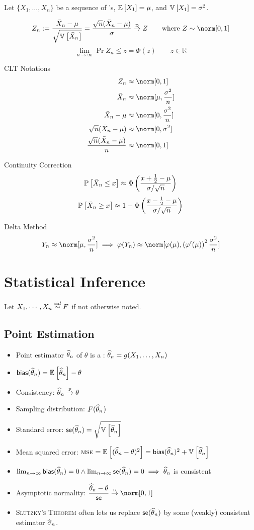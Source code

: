 \documentclass[landscape]{article}
\begin{document}
\begin{multicols*}{2}
Let $\{X_1,\ldots,X_n\}$ be a sequence of \iid \rv's, $\mathbb{E}_{}\left[X_1\right]=\mu$, and 
$\mathbb{V}_{}\left[X_1\right] = \sigma^2$.

$$ Z_n
  := \displaystyle\frac{\samplemean-\mu}{\sqrt{\V{\samplemean}}}
  = \displaystyle\frac{\sqrt{n}(\samplemean - \mu)}{\sigma}
  \dconv Z \qquad \text{where } Z\dist \norm[0,1]$$
$$\lim_{n\to\infty} \Pr{Z_n \le z} = \Phi(z) \qquad z \in \mathbb R$$

CLT Notations
\begin{align*}
Z_n &\approx \norm[0,1] \\
\samplemean &\approx \norm[\mu,\frac{\sigma^2}{n}] \\
\samplemean - \mu &\approx \norm[0,\frac{\sigma^2}{n}] \\
\sqrt{n}(\samplemean - \mu) &\approx \norm[0,\sigma^2] \\
\frac{\sqrt{n}(\samplemean - \mu)}{n} &\approx \norm[0,1] \\
\end{align*}

Continuity Correction
$$\mathbb{P}_{}\left[\bar{X}_n \le x\right] \approx 
  \Phi\left(\displaystyle\frac{x+\frac{1}{2}-\mu}{\sigma/\sqrt{n}}\right)$$
$$\mathbb{P}_{}\left[\bar{X}_n \ge x\right] \approx 
  1-\Phi\left(\displaystyle\frac{x-\frac{1}{2}-\mu}{\sigma/\sqrt{n}}\right)$$

Delta Method
$$Y_n \approx \norm[\mu,\frac{\sigma^2}{n}] \imp 
\transform(Y_n) \approx 
\norm[\transform(\mu),
  \left(\transform^\prime(\mu)\right)^2\frac{\sigma^2}{n}]$$

\section{Statistical Inference}

Let $X_1,\cdots,X_n \stackrel{iid}{\sim} F$ if not otherwise noted.

\subsection{Point Estimation}

\begin{itemize}
  \item Point estimator $\widehat{\theta}_n$ of $\theta$ is a \rv: 
    $\widehat{\theta}_n = g(X_1,\dots,X_n)$
  \item $\textsf{bias}(\widehat{\theta}_n) = \mathbb{E}_{}\left[\widehat{\theta}_n\right]-\theta$
  \item Consistency: $\widehat{\theta}_n \stackrel{\text{\tiny{P}}}{\rightarrow} \theta$
  \item Sampling distribution: $F(\widehat{\theta}_n$)
  \item Standard error: $\textsf{se}(\widehat{\theta}_n) = \sqrt{\mathbb{V}_{}\left[\widehat{\theta}_n\right]}$
  \item Mean squared error: $\textsc{mse} = \mathbb{E}_{}\left[(\widehat{\theta}_n-\theta)^2\right] 
    = \textsf{bias}(\widehat{\theta}_n)^2 + \mathbb{V}_{}\left[\widehat{\theta}_n\right]$
  \item $\lim_{n\to \infty} \textsf{bias}(\widehat{\theta}_n) = 0 \wedge \lim_{n\to \infty}\textsf{se}(\widehat{\theta}_n) = 0 
    \;\Longrightarrow\; \widehat{\theta}_n$ is consistent
  \item Asymptotic normality: 
    $\displaystyle\frac{\that_n-\theta}{\se} \dconv \norm[0,1]$
  \item \textsc{Slutzky's Theorem} often lets us replace $\textsf{se}(\widehat{\theta}_n)$
    by some (weakly) consistent estimator $\widehat{\sigma}_n$.
\end{itemize}


\end{multicols*}
\end{document}
